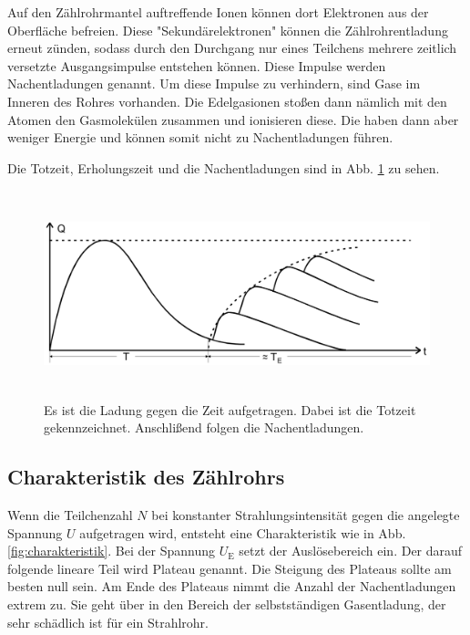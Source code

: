 \noindent Auf den Zählrohrmantel auftreffende Ionen können dort Elektronen aus der Oberfläche befreien. Diese "Sekundärelektronen" können die Zählrohrentladung erneut zünden, sodass durch den Durchgang nur eines Teilchens mehrere zeitlich versetzte Ausgangsimpulse entstehen können. 
Diese Impulse werden Nachentladungen genannt. 
Um diese Impulse zu verhindern, sind Gase im Inneren des Rohres vorhanden. Die Edelgasionen stoßen dann nämlich mit den Atomen den Gasmolekülen zusammen und ionisieren diese. Die haben dann aber weniger Energie und können somit nicht zu Nachentladungen führen. 

\noindent Die Totzeit, Erholungszeit und die Nachentladungen sind in Abb. \ref{fig:totzeit} zu sehen.

\begin{figure}
    \centering
    \includegraphics[width=12cm, height=6cm]{build/totzeit.png}
    \caption{Es ist die Ladung gegen die Zeit aufgetragen. Dabei ist die Totzeit gekennzeichnet. Anschlißend folgen die Nachentladungen. \cite{V703}}
    \label{fig:totzeit}
\end{figure}


\subsection{Charakteristik des Zählrohrs}

Wenn die Teilchenzahl $N$ bei konstanter Strahlungsintensität gegen die angelegte Spannung $U$ aufgetragen wird, entsteht eine Charakteristik wie in Abb. \ref{fig:charakteristik}. Bei der Spannung $U_\text{E}$ setzt der Auslösebereich ein. Der darauf folgende lineare Teil wird Plateau genannt. Die Steigung des Plateaus sollte am besten null sein. Am Ende des Plateaus nimmt die Anzahl der Nachentladungen extrem zu. Sie geht über in den Bereich der selbstständigen Gasentladung, der sehr schädlich ist für ein Strahlrohr.

